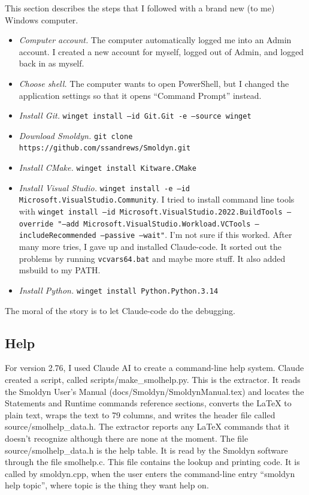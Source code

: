 \documentclass {scrbook}
\newcommand {\ttt} {\texttt}
\begin{document}
This section describes the steps that I followed with a brand new (to me) Windows computer.
\begin{itemize}
\item \textit{Computer account.} The computer automatically logged me into an Admin account. I created a new account for myself, logged out of Admin, and logged back in as myself.
\item \textit{Choose shell.} The computer wants to open PowerShell, but I changed the application settings so that it opens ``Command Prompt'' instead.
\item \textit{Install Git.} \ttt{winget install --id Git.Git -e --source winget}
\item \textit{Download Smoldyn.} \ttt{git clone https://github.com/ssandrews/Smoldyn.git}
\item \textit{Install CMake.} \ttt{winget install Kitware.CMake}
\item \textit{Install Visual Studio.} \ttt{winget install -e --id Microsoft.VisualStudio.Community}. I tried to install command line tools with \ttt{winget install --id Microsoft.VisualStudio.2022.BuildTools --override "--add Microsoft.VisualStudio.Workload.VCTools --includeRecommended --passive --wait"}. I'm not sure if this worked. After many more tries, I gave up and installed Claude-code. It sorted out the problems by running \ttt{vcvars64.bat} and maybe more stuff. It also added msbuild to my PATH.
\item \textit{Install Python.} \ttt{winget install Python.Python.3.14}
\end{itemize}
The moral of the story is to let Claude-code do the debugging.

\subsection{Help}

For version 2.76, I used Claude AI to create a command-line help system. Claude created a script, called scripts/make\_smolhelp.py. This is the extractor. It reads the Smoldyn User's Manual (docs/Smoldyn/SmoldynManual.tex) and locates the Statements and Runtime commands reference sections, converts the LaTeX to plain text, wraps the text to 79 columns, and writes the header file called source/smolhelp\_data.h. The extractor reports any LaTeX commands that it doesn't recognize although there are none at the moment. The file source/smolhelp\_data.h is the help table. It is read by the Smoldyn software through the file smolhelp.c. This file contains the lookup and printing code. It is called by smoldyn.cpp, when the user enters the command-line entry ``smoldyn help topic'', where topic is the thing they want help on.
\end{document}
